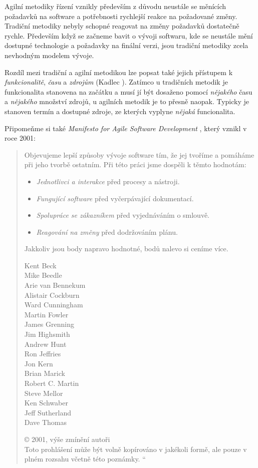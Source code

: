 Agilní metodiky řízení vznikly především z důvodu neustále se měnících požadavků na software a potřebnosti rychlejší reakce na požadované změny. Tradiční metodiky nebyly schopné reagovat na změny požadavků dostatečně rychle. Především když se začneme bavit o vývoji softwaru, kde se neustále mění dostupné technologie a požadavky na finální verzi, jsou tradiční metodiky zcela nevhodným modelem vývoje.

Rozdíl mezi tradiční a agilní metodikou lze popsat také jejich přístupem k \emph{funkcionalitě}, \emph{času} a \emph{zdrojům} (Kadlec \cite{kadlec}). Zatímco u tradičních metodik je funkcionalita stanovena na začátku a musí jí být dosaženo pomocí \emph{nějakého} času a \emph{nějakého} množství zdrojů, u agilních metodik je to přesně naopak. Typicky je stanoven termín a dostupné zdroje, ze kterých vyplyne \emph{nějaká} funcionalita.

Připomeňme si také \emph{Manifesto for Agile Software Development} \cite{manifesto}, který vznikl v roce 2001:

\begin{quote}
\quotedblbase Objevujeme lepší způsoby vývoje software tím,
že jej tvoříme a pomáháme při jeho tvorbě ostatním.
Při této práci jsme dospěli k těmto hodnotám:
\begin{itemize}
	\item \emph{Jednotlivci a interakce} před procesy a nástroji.
	\item \emph{Fungující software} před vyčerpávající dokumentací.
	\item \emph{Spolupráce se zákazníkem} před vyjednáváním o smlouvě.
	\item \emph{Reagování na změny} před dodržováním plánu.
\end{itemize}
Jakkoliv jsou body napravo hodnotné,
bodů nalevo si ceníme více.

\begin{multicols}{3}
Kent Beck\\
Mike Beedle\\
Arie van Bennekum\\
Alistair Cockburn\\
Ward Cunningham\\
Martin Fowler\\
James Grenning\\
Jim Highsmith\\
Andrew Hunt\\
Ron Jeffries\\
Jon Kern\\
Brian Marick\\
Robert C. Martin\\
Steve Mellor\\
Ken Schwaber\\
Jeff Sutherland\\
Dave Thomas\\
\end{multicols}

{\color{gray}
© 2001, výše zmínění autoři\\
Toto prohlášení může být volně kopírováno v jakékoli formě,
ale pouze v plném rozsahu včetně této poznámky.
}\textquotedblleft

\end{quote}

